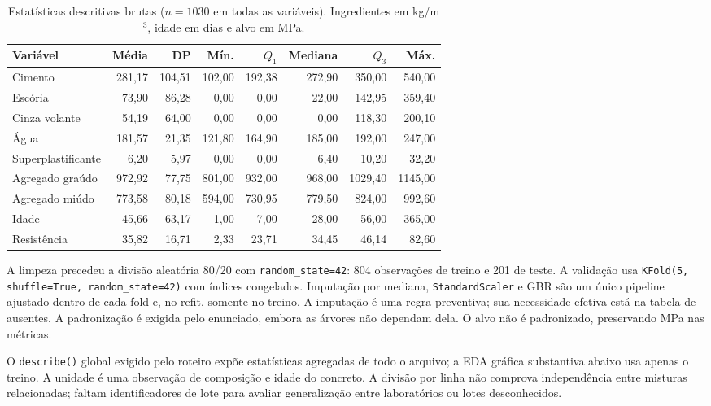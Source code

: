 \documentclass[12pt,a4paper]{article}
\begin{document}
\begin{table}[H]
\centering
\caption{Estatísticas descritivas brutas ($n=1030$ em todas as variáveis). Ingredientes em kg/m$^3$, idade em dias e alvo em MPa.}
\footnotesize
\setlength{\tabcolsep}{4.5pt}
\renewcommand{\arraystretch}{1.16}
\begin{adjustbox}{max width=\linewidth}
\begin{tabular}{@{}lrrrrrrr@{}}
\toprule
Variável & Média & DP & Mín. & $Q_1$ & Mediana & $Q_3$ & Máx. \\
\midrule
Cimento & 281{,}17 & 104{,}51 & 102{,}00 & 192{,}38 & 272{,}90 & 350{,}00 & 540{,}00 \\
Escória & 73{,}90 & 86{,}28 & 0{,}00 & 0{,}00 & 22{,}00 & 142{,}95 & 359{,}40 \\
Cinza volante & 54{,}19 & 64{,}00 & 0{,}00 & 0{,}00 & 0{,}00 & 118{,}30 & 200{,}10 \\
Água & 181{,}57 & 21{,}35 & 121{,}80 & 164{,}90 & 185{,}00 & 192{,}00 & 247{,}00 \\
Superplastificante & 6{,}20 & 5{,}97 & 0{,}00 & 0{,}00 & 6{,}40 & 10{,}20 & 32{,}20 \\
Agregado graúdo & 972{,}92 & 77{,}75 & 801{,}00 & 932{,}00 & 968{,}00 & 1029{,}40 & 1145{,}00 \\
Agregado miúdo & 773{,}58 & 80{,}18 & 594{,}00 & 730{,}95 & 779{,}50 & 824{,}00 & 992{,}60 \\
Idade & 45{,}66 & 63{,}17 & 1{,}00 & 7{,}00 & 28{,}00 & 56{,}00 & 365{,}00 \\
Resistência & 35{,}82 & 16{,}71 & 2{,}33 & 23{,}71 & 34{,}45 & 46{,}14 & 82{,}60 \\
\bottomrule
\end{tabular}
\end{adjustbox}
\end{table}

A limpeza precedeu a divisão aleatória 80/20 com \texttt{random\_state=42}: 804 observações de treino e 201 de teste. A validação usa \texttt{KFold(5, shuffle=True, random\_state=42)} com índices congelados. Imputação por mediana, \texttt{StandardScaler} e GBR são um único pipeline ajustado dentro de cada fold e, no refit, somente no treino. A imputação é uma regra preventiva; sua necessidade efetiva está na tabela de ausentes. A padronização é exigida pelo enunciado, embora as árvores não dependam dela. O alvo não é padronizado, preservando MPa nas métricas.

O \texttt{describe()} global exigido pelo roteiro expõe estatísticas agregadas de todo o arquivo; a EDA gráfica substantiva abaixo usa apenas o treino. A unidade é uma observação de composição e idade do concreto. A divisão por linha não comprova independência entre misturas relacionadas; faltam identificadores de lote para avaliar generalização entre laboratórios ou lotes desconhecidos.
\end{document}

